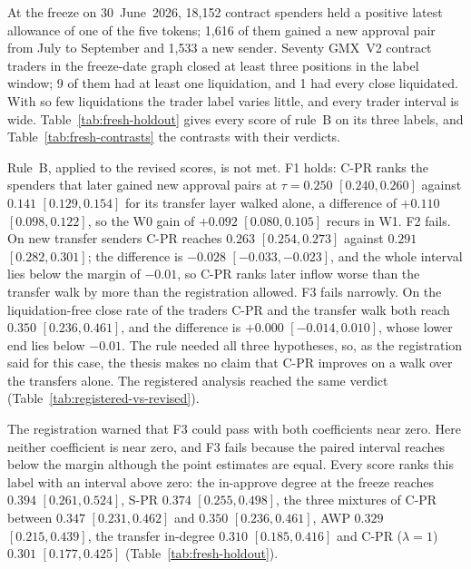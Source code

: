At the freeze on 30~June~2026, 18,152 contract spenders held a positive latest allowance of one of the five tokens; 1,616 of them gained a new approval pair from July to September and 1,533 a new sender. Seventy GMX~V2 contract traders in the freeze-date graph closed at least three positions in the label window; 9 of them had at least one liquidation, and 1 had every close liquidated. With so few liquidations the trader label varies little, and every trader interval is wide. Table~\ref{tab:fresh-holdout} gives every score of rule~B on its three labels, and Table~\ref{tab:fresh-contrasts} the contrasts with their verdicts.





Rule~B, applied to the revised scores, is not met. F1 holds: C-PR ranks the spenders that later gained new approval pairs at $\tau=0.250$ $[0.240,0.260]$ against $0.141$ $[0.129,0.154]$ for its transfer layer walked alone, a difference of $+0.110$ $[0.098,0.122]$, so the W0 gain of $+0.092$ $[0.080,0.105]$ recurs in W1. F2 fails. On new transfer senders C-PR reaches $0.263$ $[0.254,0.273]$ against $0.291$ $[0.282,0.301]$; the difference is $-0.028$ $[-0.033,-0.023]$, and the whole interval lies below the margin of $-0.01$, so C-PR ranks later inflow worse than the transfer walk by more than the registration allowed. F3 fails narrowly. On the liquidation-free close rate of the traders C-PR and the transfer walk both reach $0.350$ $[0.236,0.461]$, and the difference is $+0.000$ $[-0.014,0.010]$, whose lower end lies below $-0.01$. The rule needed all three hypotheses, so, as the registration said for this case, the thesis makes no claim that C-PR improves on a walk over the transfers alone. The registered analysis reached the same verdict (Table~\ref{tab:registered-vs-revised}).

The registration warned that F3 could pass with both coefficients near zero. Here neither coefficient is near zero, and F3 fails because the paired interval reaches below the margin although the point estimates are equal. Every score ranks this label with an interval above zero: the in-approve degree at the freeze reaches $0.394$ $[0.261,0.524]$, S-PR $0.374$ $[0.255,0.498]$, the three mixtures of C-PR between $0.347$ $[0.231,0.462]$ and $0.350$ $[0.236,0.461]$, AWP $0.329$ $[0.215,0.439]$, the transfer in-degree $0.310$ $[0.185,0.416]$ and C-PR ($\lambda=1$) $0.301$ $[0.177,0.425]$ (Table~\ref{tab:fresh-holdout}).

